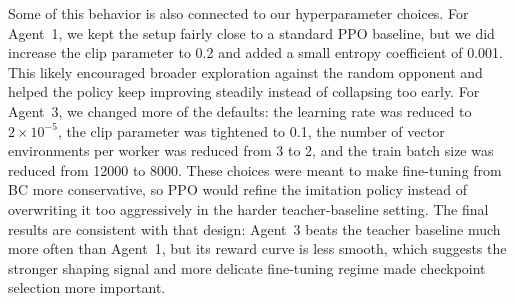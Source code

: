 \documentclass{article}
\begin{document}
Some of this behavior is also connected to our hyperparameter choices.
For Agent~1, we kept the setup fairly close to a standard PPO baseline, but we
did increase the clip parameter to 0.2 and added a small entropy coefficient of
0.001.
This likely encouraged broader exploration against the random opponent and helped
the policy keep improving steadily instead of collapsing too early.
For Agent~3, we changed more of the defaults: the learning rate was reduced to
$2\times10^{-5}$, the clip parameter was tightened to 0.1, the number of vector
environments per worker was reduced from 3 to 2, and the train batch size was
reduced from 12000 to 8000.
These choices were meant to make fine-tuning from BC more conservative, so PPO
would refine the imitation policy instead of overwriting it too aggressively in
the harder teacher-baseline setting.
The final results are consistent with that design: Agent~3 beats the teacher
baseline much more often than Agent~1, but its reward curve is less smooth, which
suggests the stronger shaping signal and more delicate fine-tuning regime made
checkpoint selection more important.

\clearpage

\end{document}

